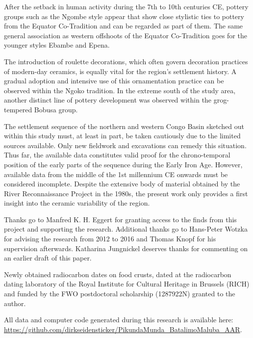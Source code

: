 \documentclass[smallextended,natbib]{svjour3}       %
\begin{document}
After the setback in human activity during the 7th to 10th centuries CE, pottery groups such as the Ngombe style appear that show close stylistic ties to pottery from the Equator Co-Tradition and can be regarded as part of them. The same general association as western offshoots of the Equator Co-Tradition goes for the younger styles Ebambe and Epena.

The introduction of roulette decorations, which often govern decoration practices of modern-day ceramics, is equally vital for the region's settlement history. A gradual adoption and intensive use of this ornamentation practice can be observed within the Ngoko tradition. In the extreme south of the study area, another distinct line of pottery development was observed within the grog-tempered Bobusa group.

The settlement sequence of the northern and western Congo Basin sketched out within this study must, at least in part, be taken cautiously due to the limited sources available. Only new fieldwork and excavations can remedy this situation. Thus far, the available data constitutes valid proof for the chrono-temporal position of the early parts of the sequence during the Early Iron Age. However, available data from the middle of the 1st millennium CE onwards must be considered incomplete. Despite the extensive body of material obtained by the River Reconnaissance Project in the 1980s, the present work only provides a first insight into the ceramic variability of the region.

\begin{acknowledgements}
Thanks go to Manfred K. H. Eggert for granting access to the finds from this project and supporting the research. Additional thanks go to Hans-Peter Wotzka for advising the research from 2012 to 2016 and Thomas Knopf for his supervision afterwards. Katharina Jungnickel deserves thanks for commenting on an earlier draft of this paper.

Newly obtained radiocarbon dates on food crusts, dated at the radiocarbon dating laboratory of the Royal Institute for Cultural Heritage in Brussels (RICH) and funded by the FWO postdoctoral scholarship (1287922N) granted to the author.

All data and computer code generated during this research is available here: \url{https://github.com/dirkseidensticker/PikundaMunda_BatalimoMaluba_AAR}.
\end{acknowledgements}



\end{document}
